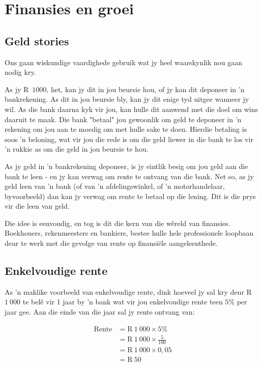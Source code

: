 \chapter{Finansies en groei}

\section{Geld stories}

Ons gaan wiskundige vaardighede gebruik wat jy heel waarskynlik nou gaan nodig kry.\par

As jy R~$1 000$, het, kan jy dit in jou beursie hou, of jy kan dit deponeer in ’n bankrekening. As dit in jou beursie bly,
kan jy dit enige tyd uitgee wanneer jy wil. As die bank daarna kyk vir jou, kan hulle dit aanwend met die doel om
wins daaruit te maak. Die bank "betaal" jou gewoonlik om geld te deponeer in ’n rekening om jou aan te moedig
om met hulle sake te doen. Hierdie betaling is soos ’n beloning, wat vir jou die rede is om die geld liewer in die
bank te los vir ’n rukkie as om die geld in jou beursie te hou.\par 

As jy geld in ’n bankrekening deponeer, is jy eintlik besig om jou geld aan die bank te leen - en jy kan verwag om
rente te ontvang van die bank. Net so, as jy geld leen van ’n bank (of van ’n afdelingswinkel, of ’n motorhandelaar,
byvoorbeeld) dan kan jy verwag om rente te betaal op die lening. Dit is die prys vir die leen van geld.\par

Die idee is eenvoudig, en tog is dit die kern van die w\^{e}reld van finansies. Boekhouers, rekenmeesters en
bankiers, bestee hulle hele professionele loopbaan deur te werk met die gevolge van rente op
finansiële aangeleenthede.\par

\section{Enkelvoudige rente}
  
As ’n maklike voorbeeld van enkelvoudige rente, dink hoeveel jy sal kry deur R~$1~000$ te belê vir 1 jaar by ’n bank
wat vir jou enkelvoudige rente teen $5\%$ per jaar gee. Aan die einde van die jaar sal jy rente ontvang van:\par
\begin{align*}
    \mbox{Rente} &= \mbox{R}~1~000 \times 5\%\\
    &= \mbox{R}~1~000 \times \frac{5}{100}\\
    &= \mbox{R}~1~000 \times 0,05\\
    &= \mbox{R}~50
\end{align*}

